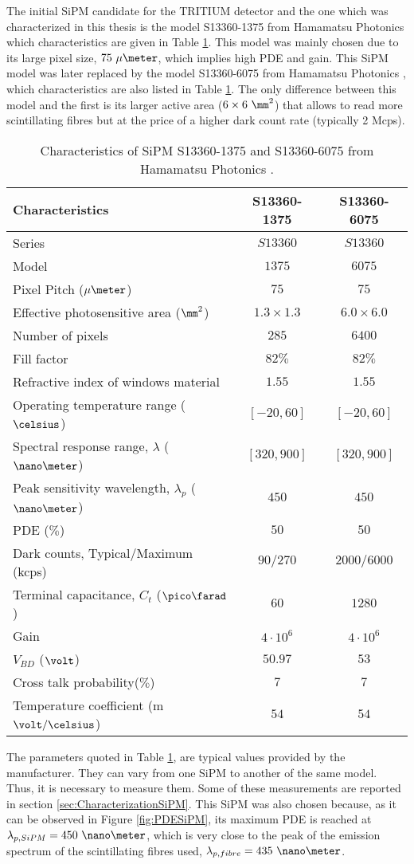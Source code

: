 The initial SiPM candidate for the TRITIUM detector and the one which was characterized in this thesis is the model S13360-1375 from Hamamatsu Photonics \cite{DataSheetHammamatsu_1_SiPM_1375} which characteristics are given in Table \ref{tab:PropertiesOfSiPM1375}. This model was mainly chosen due to its large pixel size, $75~\mu\meter$, which implies high PDE and gain. This SiPM model was later replaced by the model S13360-6075 from Hamamatsu Photonics \cite{DataSheetHammamatsu_1_SiPM_75}, which characteristics are also listed in Table \ref{tab:PropertiesOfSiPM1375}. The only difference between this model and the first is its larger active area ($6\times6~\mm^2$) that allows to read more scintillating fibres but at the price of a higher dark count rate (typically 2 Mcps).
\begin{table}[htbp]
\centering{}%
\begin{tabular}{lcc}
\toprule 
Characteristics & S13360-1375 & S13360-6075 \tabularnewline
\midrule
\midrule 
Series & $S13360$ & $S13360$ \tabularnewline
Model & $1375$ & $6075$ \tabularnewline
Pixel Pitch ($\mu\meter$) & $75$ & $75$ \tabularnewline
Effective photosensitive area ($\mm^2$) & $1.3 \times 1.3$ & $6.0 \times 6.0$ \tabularnewline
Number of pixels & $285$ & $6400$ \tabularnewline
Fill factor & $82\%$ & $82\%$ \tabularnewline
Refractive index of windows material & $1.55$ & $1.55$ \tabularnewline
Operating temperature range ($\celsius$) & $[-20,60]$ & $[-20,60]$ \tabularnewline
Spectral response range, $\lambda$ ($\nano\meter$) & $[320, 900]$ & $[320, 900]$ \tabularnewline
Peak sensitivity wavelength, $\lambda_p$ ($\nano\meter$) & $450$ & $450$ \tabularnewline
PDE ($\%$) & $50$ & $50$ \tabularnewline
Dark counts, Typical/Maximum (kcps) & $90/270$ & $2000/6000$ \tabularnewline
Terminal capacitance, $C_t$ ($\pico\farad$) & $60$ & $1280$ \tabularnewline
Gain & $4 \cdot{} 10^6$ & $4 \cdot{} 10^6$ \tabularnewline
$V_{BD}$ ($\volt$) & $50.97$ & $53$ \tabularnewline
Cross talk probability($\%$) & $7$ & $7$ \tabularnewline
Temperature coefficient (m$\volt/\celsius$) & $54$ & $54$ \tabularnewline
\bottomrule
\end{tabular}
\caption{Characteristics of SiPM S13360-1375 and S13360-6075 from Hamamatsu Photonics \cite{DataSheetHammamatsu_1_SiPM_1375}.}
\label{tab:PropertiesOfSiPM1375}
\end{table}
The parameters quoted in Table \ref{tab:PropertiesOfSiPM1375}, are typical values provided by the manufacturer. They can vary from one SiPM to another of the same model. Thus, it is necessary to measure them. Some of these measurements are reported in section \ref{sec:CharacterizationSiPM}.  This SiPM was also chosen because, as it can be observed in Figure \ref{fig:PDESiPM}, its maximum PDE is reached at $\lambda_{p,SiPM}=450~\nano\meter$, which is very close to the peak of the emission spectrum of the scintillating fibres used, $\lambda_{p,fibre}=435~\nano\meter$.
